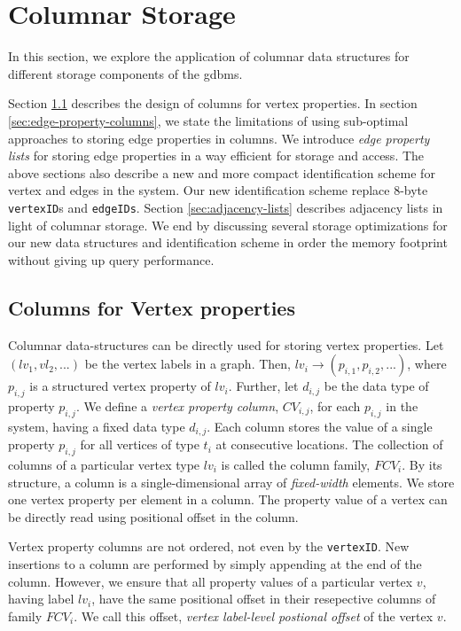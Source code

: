\chapter{Columnar Storage}
\label{c:columnar-storage}

In this section, we explore the application of columnar data structures for different storage components of the \gls{gdbms}. 

Section \ref{sec:vertex-property-columns} describes the design of columns for vertex properties. In section \ref{sec:edge-property-columns}, we state the limitations of using sub-optimal approaches to storing edge properties in columns. We introduce \emph{edge property lists} for storing edge properties in a way efficient for storage and access. The above sections also describe a new and more compact identification scheme for vertex and edges in the system. Our new identification scheme replace 8-byte \texttt{vertexID}s and \texttt{edgeIDs}. Section \ref{sec:adjacency-lists} describes adjacency lists in light of columnar storage. We end by discussing several storage optimizations for our new data structures and identification scheme in order the memory footprint without giving up query performance.

\section{Columns for Vertex properties}
\label{sec:vertex-property-columns}

Columnar data-structures can be directly used for storing vertex properties. Let $(lv_1, vl_2, ...)$ be the vertex labels in a graph. Then, $lv_i \rightarrow (p_{i,1},  p_{i,2}, ...)$, where $p_{i, j}$ is a structured vertex property of $lv_i$. Further, let $d_{i,j}$ be the data type of property $p_{i,j}$. We define a \emph{vertex property column}, $CV_{i,j}$, for each $p_{i,j}$ in the system, having a fixed data type $d_{i,j}$. Each column stores the value of a single property $p_{i,j}$ for all vertices of type $t_i$ at consecutive locations. The collection of columns of a particular vertex type $lv_i$ is called the column family, $FCV_i$. By its structure, a column is a single-dimensional array of \emph{fixed-width} elements. We store one vertex property per element in a column. The property value of a vertex can be directly read using positional offset in the column.

Vertex property columns are not ordered, not even by the \texttt{vertexID}. New insertions to a column are performed by simply appending at the end of the column. However, we ensure that all property values of a particular vertex $v$, having label $lv_i$, have the same positional offset in their resepective columns of family $FCV_i$. We call this offset, \emph{vertex label-level postional offset} of the vertex $v$. 

